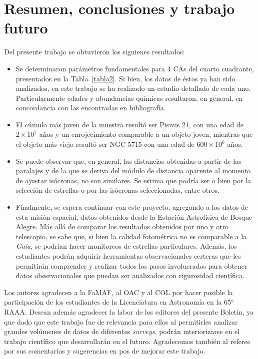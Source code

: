 \documentclass[baaa]{baaa}
\begin{document}
\section{Resumen, conclusiones y trabajo futuro}
Del presente trabajo se obtuvieron los siguienes resultados:
\begin{itemize}
    \item Se determinaron parámetros fundamentales para 4 CAs del cuarto cuadrante, presentados en la Tabla~\ref{tabla2}. Si bien, los datos de éstos ya han sido analizados, en este trabajo se ha realizado un estudio detallado de cada uno. Particularmente edades y abundancias químicas resultaron, en general, en concordancia con las encontradas en bibliograf\'ia.
    
    \item El c\'umulo m\'as joven de la muestra result\'o ser Pismis 21, con una edad de $2 \times 10^7$ a\~nos y un enrojecimiento comparable a un objeto joven, mientras que el objeto m\'as viejo result\'o ser NGC 5715 con una edad de $600 \times 10^6$ a\~nos.

    \item Se puede observar que, en general, las distancias obtenidas a partir de las paralajes y de la que se deriva del módulo de distancia aparente al momento de ajustar isócronas, no son similares. Se estima que podría ser o bien por la selección de estrellas o por las isócronas seleccionadas, entre otros.
        
    \item Finalmente, se espera continuar con este proyecto, agregando a los datos de esta misión espacial, datos obtenidos desde la Estaci\'on Astrof\'isica de Bosque Alegre. Más allá de comparar los resultados obtenidos por uno y otro telescopio, se sabe que, si bien la calidad fotométrica no es comparable a la {\sl Gaia}, se podrían hacer monitoreos de estrellas particulares. Además, los estudiantes podrán adquirir herramientas observacionales certeras que les permitirán comprender y realizar todos los pasos involucrados para obtener datos obesrvacionales que puedan ser analizados con rigurosidad científica.
\end{itemize}

\begin{acknowledgement}
Los autores agradecen a la FaMAF, al OAC y al COL por hacer posible la participaci\'on de los estudiantes de la Licenciatura en Astronom\'ia en la 65° RAAA. Desean adem\'as agradecer la labor de los editores del presente Bolet\'in, ya que dado que este trabajo fue de relevancia para ellos al permitirles analizar grandes vol\'umenes de datos de diferentes {\em surveys}, podr\'an interiorizarse en el trabajo cient\'ifico que desarrollar\'an en el futuro. Agradecemos también al referee por sus comentarios y sugerencias en pos de mejorar este trabajo.
\end{acknowledgement}
\end{document}
